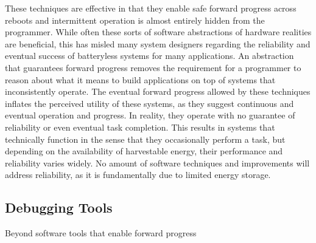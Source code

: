 These techniques are effective in that they enable safe forward progress across reboots and intermittent operation is almost entirely hidden from the programmer.
While often these sorts of software abstractions of hardware realities are beneficial, this has misled many system designers regarding the reliability and eventual success of batteryless systems for many applications.
An abstraction that guarantees forward progress removes the requirement for a programmer to
reason about what it means to build applications on top of systems that inconsistently operate. 
The eventual forward progress allowed by these techniques inflates the perceived utility of these systems, 
as they suggest continuous and eventual operation and progress. In reality, they operate with no guarantee of reliability or even eventual task completion. 
This results in systems that technically function in the sense that they occasionally perform a task, but depending on the availability of harvestable energy, their performance and reliability varies widely. 
No amount of software techniques and improvements will address reliability, as it is fundamentally due to limited energy storage.


\subsection{Debugging Tools}
Beyond software tools that enable forward progress


